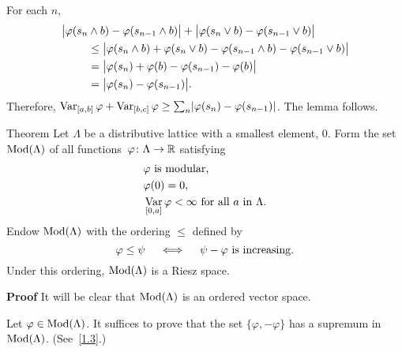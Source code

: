 \documentclass[main.tex]{subfiles}
\begin{document}
For each $n$,
\begin{align*}
 \bigl| \varphi(s_n & \wedge b) -\varphi(s_{n-1}\wedge b) \bigr|
       + \bigl| \varphi(s_n \vee b) - \varphi(s_{n-1}\vee b) \bigr|  \\
 & \leq \bigl| \varphi(s_n\wedge b)
       + \varphi(s_n \vee b) 
       -\varphi(s_{n-1}\wedge b) 
       - \varphi(s_{n-1}\vee b) \bigr| \\
 & = \bigl|\varphi(s_n) + \varphi(b) - \varphi(s_{n-1}) -\varphi(b) \bigr| \\
 & = \bigl|\varphi(s_n) - \varphi(s_{n-1})\bigr|
\textnormal{.}
\end{align*}
Therefore,
$\mathop{\mathrm{Var}}_{[a,b]}\varphi + \mathop{\mathrm{Var}}_{[b,c]}\varphi \geq
\smash{\sum_n}|\varphi(s_n)-\varphi(s_{n-1})|$.
The lemma follows.
%
%
\begin{psec}{Theorem}
\label{1.10}
Let $\Lambda$ be a distributive lattice with a smallest
element, $0$. 
Form the set~$\mathrm{Mod}(\Lambda)$
of all functions~$\varphi\colon\Lambda\rightarrow\mathbb{R}$ satisfying
\begin{align*}
&\varphi\textnormal{ is modular,} \\
&\varphi(0) = 0\textnormal{, } \\
&\mathop{\mathrm{Var}}_{[0,a]}\varphi < \infty\textnormal{ for all }a\textnormal{ in }\Lambda
\textnormal{.}
\end{align*}
Endow $\mathrm{Mod}(\Lambda)$ with the ordering $\leq$ defined by
\begin{equation*}
\varphi \leq \psi \quad \iff \quad \psi - \varphi\textnormal{ is increasing.}
\end{equation*}
Under this ordering, $\mathrm{Mod}(\Lambda)$ is a Riesz space.
\end{psec}
\textbf{Proof}
It will be clear that $\mathrm{Mod}(\Lambda)$ is an ordered vector space.

Let $\varphi\in\mathrm{Mod}(\Lambda)$. 
It suffices to prove that the set $\{\varphi,-\varphi\}$
has a supremum in~$\mathrm{Mod}(\Lambda)$. (See~\ref{1.3}.)
\end{document}
